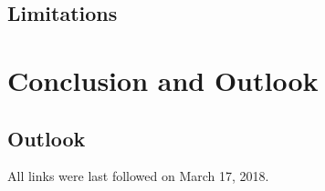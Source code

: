 \documentclass[
  a4paper,  %
  twoside,  %
  bibliography=totoc,
  headsepline,
  cleardoublepage=empty,
  parskip=half,
  draft=false
]{scrbook}
\begin{document}
\section*{Limitations}
\label{sec:limitations}


\chapter{Conclusion and Outlook}
\label{chap:zusfas}

\section*{Outlook}

\printbibliography

All links were last followed on March 17, 2018.

\appendix

\pagestyle{empty}
\renewcommand*{\chapterpagestyle}{empty}
\Versicherung
\end{document}
